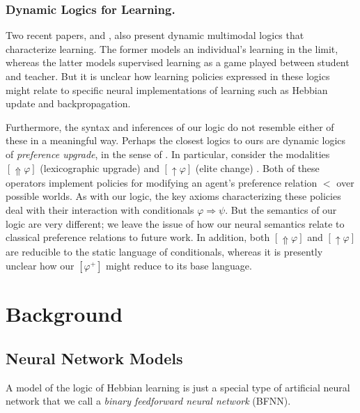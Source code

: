 \documentclass[letterpaper]{article}
\theoremstyle{definition}
\begin{document}

\subsubsection{Dynamic Logics for Learning.}
Two recent papers, \cite{baltag2019dynamic} and \cite{baltag2019right}, also present dynamic multimodal logics that characterize learning.  The former models an individual's learning in the limit, whereas the latter models supervised learning as a game played between student and teacher.  But it is unclear how learning policies expressed in these logics might relate to specific neural implementations of learning such as Hebbian update and backpropagation.

Furthermore, the syntax and inferences of our logic do not resemble either of these in a meaningful way. Perhaps the closest logics to ours are dynamic logics of \emph{preference upgrade}, in the sense of \cite{van2007prefupgrade}.  In particular, consider the modalities $[{\Uparrow} \varphi]$ (lexicographic upgrade) and $[{\uparrow} \varphi]$ (elite change) \cite{van2007beliefrevision}.  Both of these operators implement policies for modifying an agent's preference relation $<$ over possible worlds.  As with our logic, the key axioms characterizing these policies deal with their interaction with conditionals $\varphi \Rightarrow \psi$.  But the semantics of our logic are very different; we leave the issue of how our neural semantics relate to classical preference relations to future work.  In addition, both $[{\Uparrow} \varphi]$ and $[{\uparrow} \varphi]$ are reducible to the static language of conditionals, whereas it is presently unclear how our $[\varphi^+]$ might reduce to its base language.


\section{Background}

\subsection{Neural Network Models}

A model of the logic of Hebbian learning is just a special type of artificial neural network that we call a \emph{binary feedforward neural network} (BFNN).
\end{document}
